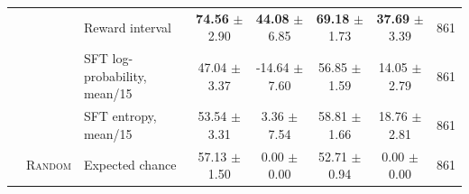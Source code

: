 \begin{table}[t]
\begin{tabular}{lllccccc}
 &  & Reward interval & \textbf{74.56} $\pm$ 2.90 & \textbf{44.08} $\pm$ 6.85 & \textbf{69.18} $\pm$ 1.73 & \textbf{37.69} $\pm$ 3.39 & 861 \\
 &  & SFT log-probability, mean/15 & 47.04 $\pm$ 3.37 & -14.64 $\pm$ 7.60 & 56.85 $\pm$ 1.59 & 14.05 $\pm$ 2.79 & 861 \\
 &  & SFT entropy, mean/15 & 53.54 $\pm$ 3.31 & 3.36 $\pm$ 7.54 & 58.81 $\pm$ 1.66 & 18.76 $\pm$ 2.81 & 861 \\
 & \textsc{Random} & Expected chance & 57.13 $\pm$ 1.50 & 0.00 $\pm$ 0.00 & 52.71 $\pm$ 0.94 & 0.00 $\pm$ 0.00 & 861 \\
\bottomrule
\end{tabular}
\end{table}
